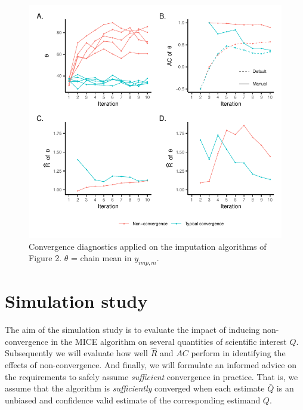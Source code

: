 \documentclass[Royal,times,sageh]{sagej}
\begin{document}
\begin{figure}

{\centering \includegraphics{manuscript_files/figure-latex/diagnostics-1} 

}

\caption{Convergence diagnostics applied on the imputation algorithms of Figure 2. $\theta$ = chain mean in $y_{imp, m}$.}\label{fig:diagnostics}
\end{figure}

\hypertarget{simulation-study}{%
\section{Simulation study}\label{simulation-study}}

The aim of the simulation study is to evaluate the impact of inducing
non-convergence in the MICE algorithm on several quantities of
scientific interest \(Q\). Subsequently we will evaluate how well
\(\widehat{R}\) and \(AC\) perform in identifying the effects of
non-convergence. And finally, we will formulate an informed advice on
the requirements to safely assume \emph{sufficient} convergence in
practice. That is, we assume that the algorithm is \emph{sufficiently}
converged when each estimate \(\bar{Q}\) is an unbiased and confidence
valid estimate of the corresponding estimand \(Q\).
\end{document}
